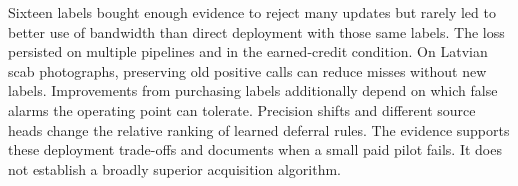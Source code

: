 Sixteen labels bought enough evidence to reject many updates but rarely led to better use of bandwidth than direct deployment with those same labels. The loss persisted on multiple pipelines and in the earned-credit condition. On Latvian scab photographs, preserving old positive calls can reduce misses without new labels. Improvements from purchasing labels additionally depend on which false alarms the operating point can tolerate. Precision shifts and different source heads change the relative ranking of learned deferral rules. The evidence supports these deployment trade-offs and documents when a small paid pilot fails. It does not establish a broadly superior acquisition algorithm.
